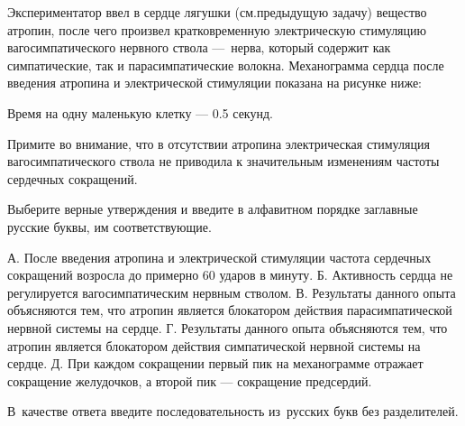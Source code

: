 
Экспериментатор ввел в сердце лягушки (см.предыдущую задачу) вещество атропин, после чего произвел кратковременную электрическую стимуляцию вагосимпатического нервного ствола — нерва, который содержит как симпатические, так и парасимпатические волокна. Механограмма сердца после введения атропина и электрической стимуляции показана на рисунке ниже:


Время на одну маленькую клетку — 0.5 секунд.

Примите во внимание, что в отсутствии атропина электрическая стимуляция вагосимпатического ствола не приводила к значительным изменениям частоты сердечных сокращений.  

Выберите верные утверждения и введите в алфавитном порядке заглавные русские буквы, им соответствующие.

А. После введения атропина и электрической стимуляции частота сердечных сокращений возросла до примерно 60 ударов в минуту.
Б. Активность сердца не регулируется вагосимпатическим нервным стволом.
В. Результаты данного опыта объясняются тем, что атропин является блокатором действия парасимпатической нервной системы на сердце.
Г. Результаты данного опыта объясняются тем, что атропин является блокатором действия симпатической нервной системы на сердце.
Д. При каждом сокращении первый пик на механограмме отражает сокращение желудочков, а второй пик — сокращение предсердий.

В качестве ответа введите последовательность из русских букв без разделителей.